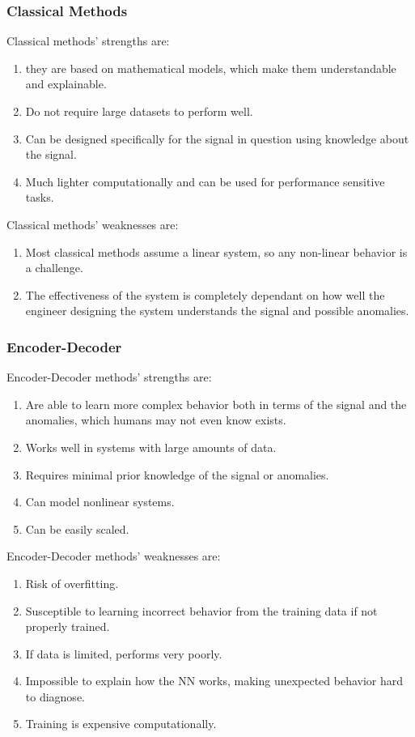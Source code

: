 \subsubsection{Classical Methods}
Classical methods' strengths are:
\begin{enumerate}
    \item they are based on mathematical models, which make them understandable and explainable.
    \item Do not require large datasets to perform well.
    \item Can be designed specifically for the signal in question using knowledge about the signal.
    \item Much lighter computationally and can be used for performance sensitive tasks.
\end{enumerate}
Classical methods' weaknesses are:
\begin{enumerate}
    \item Most classical methods assume a linear system, so any non-linear behavior is a challenge.
    \item The effectiveness of the system is completely dependant on how well the engineer designing the system understands the signal and possible anomalies.
\end{enumerate}
\subsubsection{Encoder-Decoder}
Encoder-Decoder methods' strengths are:
\begin{enumerate}
    \item Are able to learn more complex behavior both in terms of the signal and the anomalies, which humans may not even know exists.
    \item Works well in systems with large amounts of data.
    \item Requires minimal prior knowledge of the signal or anomalies.
    \item Can model nonlinear systems.
    \item Can be easily scaled.
\end{enumerate}
Encoder-Decoder methods' weaknesses are:
\begin{enumerate}
    \item Risk of overfitting.
    \item Susceptible to learning incorrect behavior from the training data if not properly trained.
    \item If data is limited, performs very poorly.
    \item Impossible to explain how the NN works, making unexpected behavior hard to diagnose.
    \item Training is expensive computationally.
\end{enumerate}
